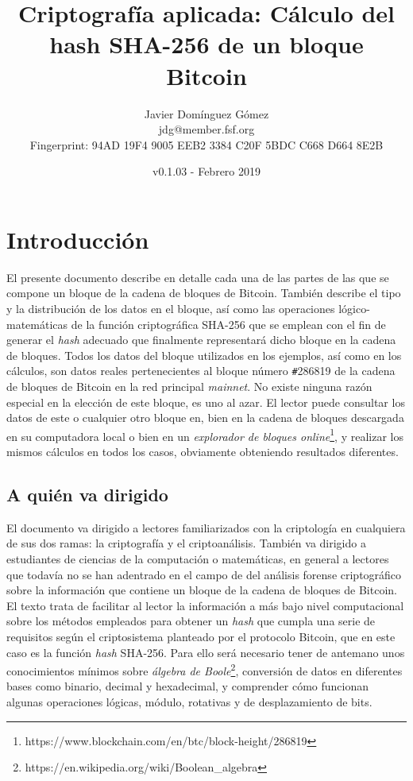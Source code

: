 \documentclass{article}
\title{\textbf{Criptografía aplicada: Cálculo del hash SHA-256 de un bloque Bitcoin}}
\author{Javier Domínguez Gómez \\
\small{jdg@member.fsf.org} \\
\small{Fingerprint: 94AD 19F4 9005 EEB2 3384 C20F 5BDC C668 D664 8E2B}}
\date{v0.1.03 - Febrero 2019}
\begin{document}
\maketitle

\tableofcontents{}

\section{Introducción}
    El presente documento describe en detalle cada una de las partes de las que se compone un bloque de la cadena de bloques de Bitcoin. También describe el tipo y la distribución de los datos en el bloque, así como las operaciones lógico-matemáticas de la función criptográfica SHA-256 que se emplean con el fin de generar el \textit{hash} adecuado que finalmente representará dicho bloque en la cadena de bloques. Todos los datos del bloque utilizados en los ejemplos, así como en los cálculos, son datos reales pertenecientes al bloque número \texttt{\#}286819 de la cadena de bloques de Bitcoin en la red principal \textit{mainnet}. No existe ninguna razón especial en la elección de este bloque, es uno al azar. El lector puede consultar los datos de este o cualquier otro bloque en, bien en la cadena de bloques descargada en su computadora local o bien en un \textit{explorador de bloques online}\footnote{https://www.blockchain.com/en/btc/block-height/286819}, y realizar los mismos cálculos en todos los casos, obviamente obteniendo resultados diferentes.
    
    \subsection{A quién va dirigido}
    El documento va dirigido a lectores familiarizados con la criptología en cualquiera de sus dos ramas: la criptografía y el criptoanálisis. También va dirigido a estudiantes de ciencias de la computación o matemáticas, en general a lectores que todavía no se han adentrado en el campo de del análisis forense criptográfico sobre la información que contiene un bloque de la cadena de bloques de Bitcoin. El texto trata de facilitar al lector la información a más bajo nivel computacional sobre los métodos empleados para obtener un \textit{hash} que cumpla una serie de requisitos según el criptosistema planteado por el protocolo Bitcoin, que en este caso es la función \textit{hash} SHA-256. Para ello será necesario tener de antemano unos conocimientos mínimos sobre \textit{álgebra de Boole}\footnote{https://en.wikipedia.org/wiki/Boolean\_algebra}, conversión de datos en diferentes bases como binario, decimal y hexadecimal, y comprender cómo funcionan algunas operaciones lógicas, módulo, rotativas y de desplazamiento de bits.
\end{document}
